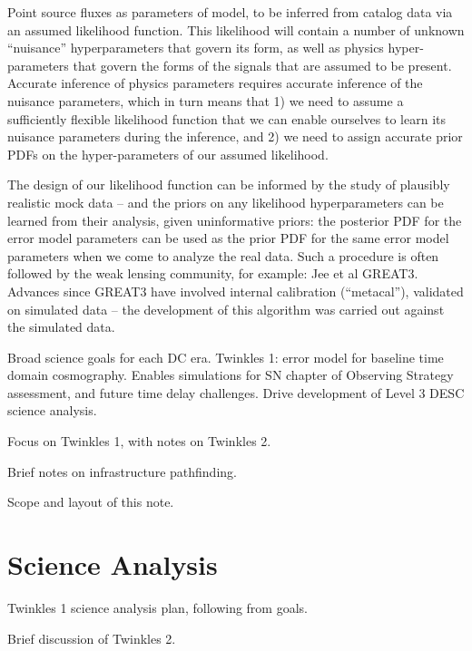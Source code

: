 \documentclass[\docopts]{\docclass}
\begin{document}
Point source fluxes as parameters of model, to be inferred from catalog data via an assumed likelihood function. This likelihood will contain a number of unknown ``nuisance'' hyperparameters that govern its form, as well as physics hyper-parameters that govern the forms of the signals that are assumed to be present. Accurate inference of physics parameters requires accurate inference of the nuisance parameters, which in turn means that 1) we need to assume a sufficiently flexible likelihood function that we can enable ourselves to learn its nuisance parameters during the inference, and 2) we need to assign accurate prior PDFs on the  hyper-parameters of our assumed likelihood.

The design of our likelihood function can be informed by the study of plausibly realistic mock data -- and the priors on any likelihood hyperparameters can be learned from their analysis, given uninformative priors: the posterior PDF for the error model parameters can be used as the prior PDF for the same error model parameters when we come to analyze the real data.  Such a procedure is often followed by the weak lensing community, for example: Jee et al GREAT3.
Advances since GREAT3 have involved internal calibration (``metacal''), validated on simulated data -- the development of this algorithm was carried out against the simulated data.

Broad science goals for each DC era. Twinkles 1: error model for baseline time domain cosmography. Enables simulations for SN chapter of Observing Strategy assessment, and future time delay challenges. Drive development of Level 3 DESC science analysis.

Focus on Twinkles 1, with notes on Twinkles 2.

Brief notes on infrastructure pathfinding.

Scope and layout of this note.


\section{Science Analysis}
\label{sec:science}

Twinkles 1 science analysis plan, following from goals.

Brief discussion of Twinkles 2.


\end{document}
